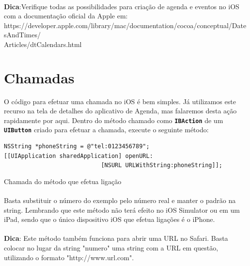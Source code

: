 \documentclass[a4paper,12pt,brazil,doubleside]{book}
\begin{document}
\begin{singlespace}
\bigskip

\begin{framed}
\paragraph{}\textbf{Dica}:Verifique todas as possibilidades para criação de agenda e eventos no iOS com a documentação oficial da Apple em:\\ https://developer.apple.com/library/mac/documentation/cocoa/conceptual/DatesAndTimes/\\Articles/dtCalendars.html
\end{framed}

\section{Chamadas}

\paragraph{}O código para efetuar uma chamada no iOS é bem simples. Já utilizamos este recurso na tela de detalhes do aplicativo de Agenda, mas falaremos desta ação rapidamente por aqui.
Dentro do método chamado como \texttt{\textbf{IBAction}} de um \texttt{\textbf{UIButton}} criado para efetuar a chamada, execute o seguinte método:

\begin{listing}[H]
\begin{verbatim}
NSString *phoneString = @"tel:0123456789";
[[UIApplication sharedApplication] openURL:
                            [NSURL URLWithString:phoneString]];
\end{verbatim}
\caption{Chamada do método que efetua ligação}
\end{listing}

\paragraph{}Basta substituir o número do exemplo pelo número real e manter o padrão na string. Lembrando que este método não terá efeito no iOS Simulator ou em um iPad, sendo que o único dispositivo iOS que efetua ligações é o iPhone.

\begin{framed}
\paragraph{}\textbf{Dica}: Este método também funciona para abrir uma URL no Safari. Basta colocar no lugar da string "numero" uma string com a URL em questão, utilizando o formato "http://www.url.com".
\end{framed}



\end{singlespace}
\end{document}
